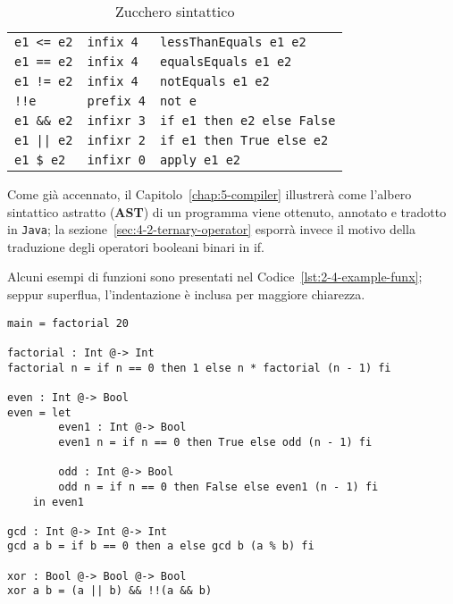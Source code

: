 \begin{table}[H]
\begin{center}
\begin{tabularx}{\textwidth}{|P{7em}@{\quad}P{7em}|X|}
            \texttt{e1 <= e2}            & \texttt{infix 4}  & \texttt{lessThanEquals e1 e2}     \\
            \texttt{e1 == e2}            & \texttt{infix 4}  & \texttt{equalsEquals e1 e2}       \\
            \texttt{e1 != e2}            & \texttt{infix 4}  & \texttt{notEquals e1 e2}          \\
            \texttt{!!e}                 & \texttt{prefix 4} & \texttt{not e}                    \\
            \texttt{e1 \&\& e2}          & \texttt{infixr 3} & \texttt{if e1 then e2 else False} \\
            \texttt{e1 || e2}            & \texttt{infixr 2} & \texttt{if e1 then True else e2}  \\
            \texttt{e1 \$ e2}            & \texttt{infixr 0} & \texttt{apply e1 e2}              \\
            \hline
        \end{tabularx}
    \end{center}
    \caption{Zucchero sintattico}
    \label{tab:2-4-sugar}
\end{table}

\newpage

\noindent Come già accennato, il Capitolo~\ref{chap:5-compiler} illustrerà come l'albero sintattico astratto (\textbf{AST})
di un programma viene ottenuto, annotato e tradotto in \texttt{Java}; la sezione~\ref{sec:4-2-ternary-operator}
esporrà invece il motivo della traduzione degli operatori booleani binari in if.

\noindent Alcuni esempi di funzioni sono presentati nel Codice~\ref{lst:2-4-example-funx};
seppur superflua, l'indentazione è inclusa per maggiore chiarezza.

\vspace{4mm}
\begin{lstlisting}[caption={Esempio di programma}, style=funxCode, label={lst:2-4-example-funx}]
main = factorial 20

factorial : Int @-> Int
factorial n = if n == 0 then 1 else n * factorial (n - 1) fi

even : Int @-> Bool
even = let
        even1 : Int @-> Bool
        even1 n = if n == 0 then True else odd (n - 1) fi

        odd : Int @-> Bool
        odd n = if n == 0 then False else even1 (n - 1) fi
    in even1

gcd : Int @-> Int @-> Int
gcd a b = if b == 0 then a else gcd b (a % b) fi

xor : Bool @-> Bool @-> Bool
xor a b = (a || b) && !!(a && b)
\end{lstlisting}